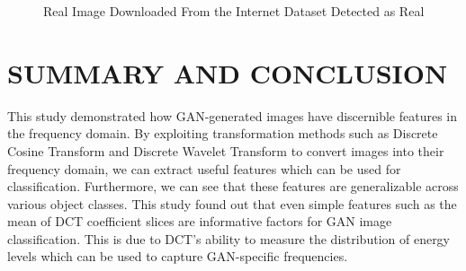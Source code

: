 \documentclass{icsthesis}
\begin{document}
\begin{mainmatter}
\begin{figure}
    \centering
    \hfil
    \hfil
    \caption{Real Image Downloaded From the Internet Dataset Detected as Real}
    \label{fig:mainfig}
\end{figure}
		

\section{SUMMARY AND CONCLUSION}
This study demonstrated how GAN-generated images have discernible features in the frequency domain. By exploiting transformation methods such as Discrete Cosine Transform and Discrete Wavelet Transform to convert images into their frequency domain, we can extract useful features which can be used for classification. Furthermore, we can see that these features are generalizable across various object classes. This study found out that even simple features such as the mean of DCT coefficient slices are informative factors for GAN image classification. This is due to DCT's ability to measure the distribution of energy levels which can be used to capture GAN-specific frequencies.  


\end{mainmatter}
\end{document}
